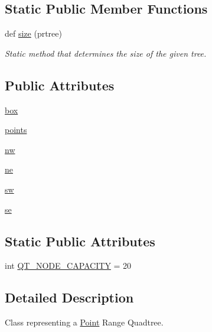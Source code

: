 \subsection*{Static Public Member Functions}
\begin{DoxyCompactItemize}
\item 
def \hyperlink{classprquadtree_1_1PRQuadTree_a5dd006b80f1697585a10722fba06e9ba}{size} (prtree)
\begin{DoxyCompactList}\small\item\em Static method that determines the size of the given tree. \end{DoxyCompactList}\end{DoxyCompactItemize}
\subsection*{Public Attributes}
\begin{DoxyCompactItemize}
\item 
\hyperlink{classprquadtree_1_1PRQuadTree_a2f1d8e21568aa0467a7dabedb50e3593}{box}
\item 
\hyperlink{classprquadtree_1_1PRQuadTree_a6534693edb5dd5450859c5b4b0773936}{points}
\item 
\hyperlink{classprquadtree_1_1PRQuadTree_a6d0f1330cc70f704f8153fd1f386b9c3}{nw}
\item 
\hyperlink{classprquadtree_1_1PRQuadTree_acf96c88788ee32d03032c490b9a90f68}{ne}
\item 
\hyperlink{classprquadtree_1_1PRQuadTree_aee59816ff69872d39d406a103dd2e2f8}{sw}
\item 
\hyperlink{classprquadtree_1_1PRQuadTree_acf5a1f668e9962b03120856564e0a3b0}{se}
\end{DoxyCompactItemize}
\subsection*{Static Public Attributes}
\begin{DoxyCompactItemize}
\item 
int \hyperlink{classprquadtree_1_1PRQuadTree_a8a1b023159e61d011e1c1c94f3534a87}{Q\+T\+\_\+\+N\+O\+D\+E\+\_\+\+C\+A\+P\+A\+C\+I\+T\+Y} = 20
\end{DoxyCompactItemize}


\subsection{Detailed Description}
Class representing a \hyperlink{classprquadtree_1_1Point}{Point} Range Quadtree. 



